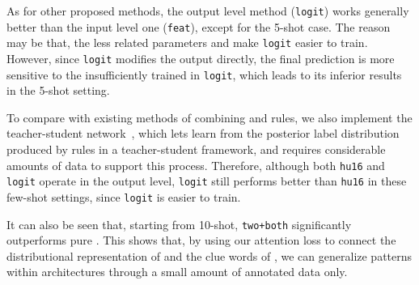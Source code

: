 As for other proposed methods, the output level method (\texttt{logit}) works generally better than the input level one (\texttt{feat}), except for the 5-shot case.
The reason may be that, the less \RE related parameters and 
make \texttt{logit} easier to train. 
However, since \texttt{logit} modifies the output directly, the final prediction is more sensitive to the insufficiently trained  in \texttt{logit}, which leads to its inferior results in the 5-shot setting.

To compare with existing methods of combining \NN and rules, we also implement the teacher-student
network~\cite{hu2016harnessing}, %
which lets \NN learn from the posterior label distribution produced by \FOL rules in a teacher-student framework,
and requires considerable amounts of data to support this process.
Therefore, although both \texttt{hu16} and \texttt{logit} operate in the output level, \texttt{logit}
still performs better than \texttt{hu16} in these few-shot settings, since \texttt{logit} is easier to train.


It can also be seen that, starting from 10-shot, \texttt{two+both} significantly outperforms pure \RE.
This shows that, by using our attention loss to connect the distributional representation of \NN and the clue words of \RE, we can generalize \RE patterns within \NN architectures through a small amount of annotated data only.


